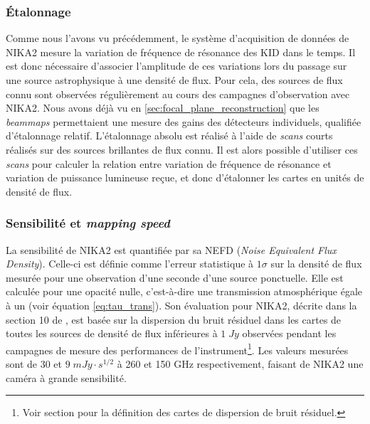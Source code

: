 \subsubsection{Étalonnage} %
Comme nous l'avons vu précédemment, le système d'acquisition de données de NIKA2 mesure la variation de fréquence de résonance des KID dans le temps.
Il est donc nécessaire d'associer l'amplitude de ces variations lors du passage sur une source astrophysique à une densité de flux.
Pour cela, des sources de flux connu sont observées régulièrement au cours des campagnes d'observation avec NIKA2.
Nous avons déjà vu en \ref{sec:focal_plane_reconstruction} que les \textit{beammaps} permettaient une mesure des gains des détecteurs individuels, qualifiée d'étalonnage relatif.
L'étalonnage absolu est réalisé à l'aide de \textit{scans} courts réalisés sur des sources brillantes de flux connu.
Il est alors possible d'utiliser ces \textit{scans} pour calculer la relation entre variation de fréquence de résonance et variation de puissance lumineuse reçue, et donc d'étalonner les cartes en unités de densité de flux.

\subsubsection{Sensibilité et \textit{mapping speed}} %
La sensibilité de NIKA2 est quantifiée par sa NEFD (\textit{Noise Equivalent Flux Density}).
Celle-ci est définie comme l'erreur statistique à $1\sigma$ sur la densité de flux mesurée pour une observation d'une seconde d'une source ponctuelle.
Elle est calculée pour une opacité nulle, c'est-à-dire une transmission atmosphérique égale à un (voir équation \ref{eq:tau_trans}).
Son évaluation pour NIKA2, décrite dans la section 10 de \cite{perotto_calibration_2020}, est basée sur la dispersion du bruit résiduel dans les cartes de toutes les sources de densité de flux inférieures à $1 \;\unit{Jy}$ observées pendant les campagnes de mesure des performances de l'instrument\footnote{Voir section  pour la définition des cartes de dispersion de bruit résiduel.}.
Les valeurs mesurées sont de $30$ et $9 \;\unit{mJy \cdot s^{1/2}}$ à 260 et 150 GHz respectivement, faisant de NIKA2 une caméra à grande sensibilité.

